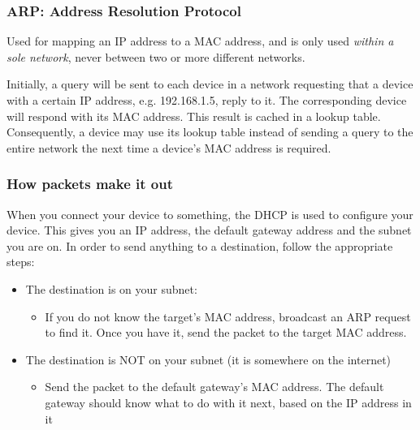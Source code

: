 \documentclass{article}
\begin{document}
\subsubsection{ARP: Address Resolution Protocol}

Used for mapping an IP address to a MAC address, and is only used \textit{within a sole network}, never between two or more different networks.

Initially, a query will be sent to each device in a network requesting that a device with a certain IP address, e.g. 192.168.1.5, reply to it. The corresponding device will respond with its MAC address. This result is cached in a lookup table. Consequently, a device may use its lookup table instead of sending a query to the entire network the next time a device's MAC address is required.

\subsubsection{How packets make it out}

When you connect your device to something, the DHCP is used to configure your device. This gives you an IP address, the default gateway address and the subnet you are on. In order to send anything to a destination, follow the appropriate steps:
\begin{itemize}
\item The destination is on your subnet:

\begin{itemize}
\item If you do not know the target's MAC address, broadcast an ARP request to find it. Once you have it, send the packet to the target MAC address.
\end{itemize}

\item The destination is NOT on your subnet (it is somewhere on the internet)
\begin{itemize}
\item Send the packet to the default gateway's MAC address. The default gateway should know what to do with it next, based on the IP address in it
\end{itemize}
\end{itemize}
\end{document}
